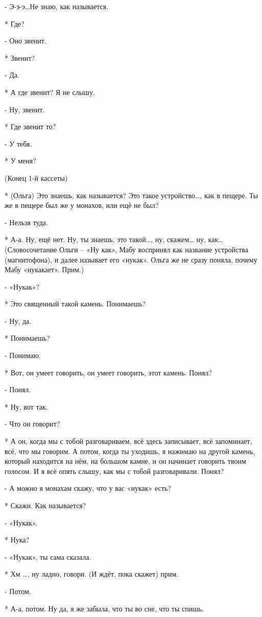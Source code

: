 - Э-э-э…Не знаю, как называется.

* Где?

- Оно  звенит.

* Звенит?

- Да.

* А где звенит? Я не слышу.

- Ну, звенит.

* Где звенит то?

- У тебя.

* У меня?

(Конец 1-й кассеты)


* (Ольга) Это знаешь, как называется? Это такое устройство…, как в пещере. Ты же в пещере был же у монахов, или ещё не был? 

- Нельзя туда.

* А-а. Ну, ещё нет. Ну, ты знаешь, это такой…, ну, скажем… ну, как… 
(Словосочетание Ольги – «Ну как», Мабу воспринял как название устройства (магнитофона), и далее называет его «нукак». Ольга же не сразу поняла, почему Мабу «нукакает». Прим.)

- «Нукак»?

* Это священный такой камень. Понимаешь?

- Ну, да.

* Понимаешь?

- Понимаю.

* Вот, он умеет говорить, он умеет говорить, этот камень. Понял?

- Понял.

* Ну, вот так.

- Что он говорит?

* А он, когда  мы с тобой разговариваем, всё здесь записывает, всё запоминает, всё, что мы говорим. А потом, когда ты уходишь, я нажимаю на другой камень, который находится на нём, на большом камне, и он начинает говорить твоим голосом. И я всё опять слышу, как мы с тобой разговаривали. Понял?

- А можно я монахам скажу, что у вас «нукак» есть?

* Скажи. Как называется?

- «Нукак».

* Нука?

- «Нукак», ты сама сказала.

* Хм …,  ну ладно, говори. (И ждёт, пока скажет) прим.

- Потом.

* А-а, потом. Ну да, я же забыла, что ты во сне, что ты спишь.

